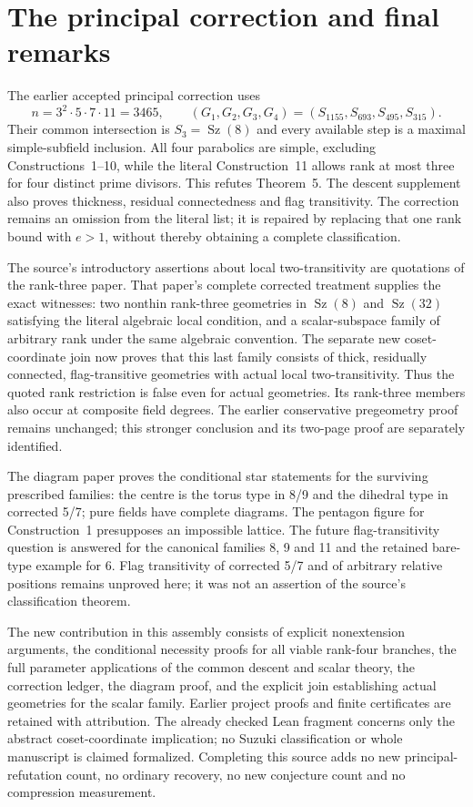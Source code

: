 \documentclass[11pt,a4paper]{article}
\newcommand{\Sz}{\operatorname{Sz}}
\begin{document}
\section{The principal correction and final remarks}
The earlier accepted principal correction uses
\[
 n=3^2\cdot5\cdot7\cdot11=3465,
 \qquad (G_1,G_2,G_3,G_4)=(S_{1155},S_{693},S_{495},S_{315}).
\]
Their common intersection is $S_3=\Sz(8)$ and every available step
is a maximal simple-subfield inclusion. All four parabolics are simple,
excluding Constructions~1--10, while the literal Construction~11 allows
rank at most three for four distinct prime divisors. This refutes
Theorem~5. The descent supplement also proves thickness, residual
connectedness and flag transitivity. The correction remains an omission
from the literal list; it is repaired by replacing that one rank bound
with $e>1$, without thereby obtaining a complete classification.

The source's introductory assertions about local two-transitivity are
quotations of the rank-three paper. That paper's complete corrected
treatment supplies the exact witnesses: two nonthin rank-three geometries
in $\Sz(8)$ and $\Sz(32)$ satisfying the literal algebraic local
condition, and a scalar-subspace family of arbitrary rank under the same
algebraic convention. The separate new coset-coordinate join now proves
that this last family consists of thick, residually connected,
flag-transitive geometries with actual local two-transitivity. Thus the
quoted rank restriction is false even for actual geometries. Its
rank-three members also occur at composite field degrees. The earlier
conservative pregeometry proof remains unchanged; this stronger
conclusion and its two-page proof are separately identified.

The diagram paper proves the conditional star statements for the surviving
prescribed families: the centre is the torus type in 8/9 and the dihedral
type in corrected 5/7; pure fields have complete diagrams. The pentagon
figure for Construction~1 presupposes an impossible lattice. The future
flag-transitivity question is answered for the canonical families 8, 9
and 11 and the retained bare-type example for 6. Flag transitivity of
corrected 5/7 and of arbitrary relative positions remains unproved here;
it was not an assertion of the source's classification theorem.

The new contribution in this assembly consists of explicit nonextension
arguments, the conditional necessity proofs for all viable rank-four
branches, the full parameter applications of the common descent and
scalar theory, the correction ledger, the diagram proof, and the
explicit join establishing actual geometries for the scalar family. Earlier
project proofs and finite certificates are retained with attribution.
The already checked Lean fragment concerns only the abstract coset-coordinate
implication; no Suzuki classification or whole manuscript is claimed
formalized. Completing this source adds no new principal-refutation count,
no ordinary recovery, no new conjecture count and no compression measurement.
\end{document}
